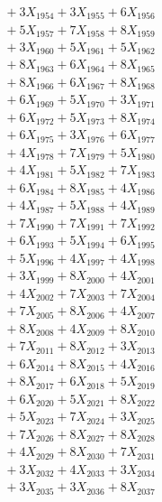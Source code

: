 \documentclass[a4paper,10pt]{article}
\begin{document}
{\begin{align}
&\;  + 3 X_{1954} + 3 X_{1955} + 6 X_{1956} \\[0.3ex]
&\;  + 5 X_{1957} + 7 X_{1958} + 8 X_{1959} \\[0.5ex]\allowbreak
&\;  + 3 X_{1960} + 5 X_{1961} + 5 X_{1962} \\[0.3ex]
&\;  + 8 X_{1963} + 6 X_{1964} + 8 X_{1965} \\[0.3ex]
&\;  + 8 X_{1966} + 6 X_{1967} + 8 X_{1968} \\[0.3ex]
&\;  + 6 X_{1969} + 5 X_{1970} + 3 X_{1971} \\[0.3ex]
&\;  + 6 X_{1972} + 5 X_{1973} + 8 X_{1974} \\[0.3ex]
&\;  + 6 X_{1975} + 3 X_{1976} + 6 X_{1977} \\[0.3ex]
&\;  + 4 X_{1978} + 7 X_{1979} + 5 X_{1980} \\[0.3ex]
&\;  + 4 X_{1981} + 5 X_{1982} + 7 X_{1983} \\[0.3ex]
&\;  + 6 X_{1984} + 8 X_{1985} + 4 X_{1986} \\[0.3ex]
&\;  + 4 X_{1987} + 5 X_{1988} + 4 X_{1989} \\[0.5ex]\allowbreak
&\;  + 7 X_{1990} + 7 X_{1991} + 7 X_{1992} \\[0.3ex]
&\;  + 6 X_{1993} + 5 X_{1994} + 6 X_{1995} \\[0.3ex]
&\;  + 5 X_{1996} + 4 X_{1997} + 4 X_{1998} \\[0.3ex]
&\;  + 3 X_{1999} + 8 X_{2000} + 4 X_{2001} \\[0.3ex]
&\;  + 4 X_{2002} + 7 X_{2003} + 7 X_{2004} \\[0.3ex]
&\;  + 7 X_{2005} + 8 X_{2006} + 4 X_{2007} \\[0.3ex]
&\;  + 8 X_{2008} + 4 X_{2009} + 8 X_{2010} \\[0.3ex]
&\;  + 7 X_{2011} + 8 X_{2012} + 3 X_{2013} \\[0.3ex]
&\;  + 6 X_{2014} + 8 X_{2015} + 4 X_{2016} \\[0.3ex]
&\;  + 8 X_{2017} + 6 X_{2018} + 5 X_{2019} \\[0.5ex]\allowbreak
&\;  + 6 X_{2020} + 5 X_{2021} + 8 X_{2022} \\[0.3ex]
&\;  + 5 X_{2023} + 7 X_{2024} + 3 X_{2025} \\[0.3ex]
&\;  + 7 X_{2026} + 8 X_{2027} + 8 X_{2028} \\[0.3ex]
&\;  + 4 X_{2029} + 8 X_{2030} + 7 X_{2031} \\[0.3ex]
&\;  + 3 X_{2032} + 4 X_{2033} + 3 X_{2034} \\[0.3ex]
&\;  + 3 X_{2035} + 3 X_{2036} + 8 X_{2037} \\[0.3ex]

\end{align}}
\end{document}
